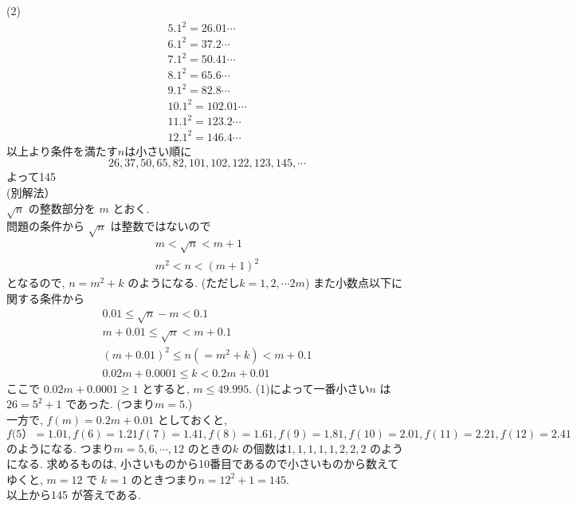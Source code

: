\documentclass[12pt,a4j]{jarticle}
\begin{document}
(2)
\begin{align*}
5.1^2=26.01\cdots
\\6.1^2=37.2\cdots
\\7.1^2=50.41\cdots
\\8.1^2=65.6\cdots
\\9.1^2=82.8\cdots
\\10.1^2=102.01\cdots
\\11.1^2=123.2\cdots
\\12.1^2=146.4\cdots
\end{align*}
以上より条件を満たす$n$は小さい順に
$$
26,37,50,65,82,101,102,122,123,145,\cdots
$$
よって145 \\

(別解法） \\
$\sqrt{n}$ の整数部分を $m$ とおく.　\\
問題の条件から $\sqrt{n}$ は整数ではないので
\begin{align*}
 m < \sqrt{n} < m + 1 \\
 m^2 < n < (m+1)^2
\end{align*}
となるので, $n=m^2 + k$ のようになる. (ただし$k =1, 2, \cdots 2m$)
また小数点以下に関する条件から
\begin{align*}
0.01 \le \sqrt{n} -m < 0.1 \\
m + 0.01 \le \sqrt{n} < m + 0.1 \\
(m + 0.01)^2 \le n (=m^2 + k) < m + 0.1 \\
0.02m + 0.0001 \le k < 0.2m + 0.01
\end{align*}
ここで $0.02m + 0.0001 \ge 1$ とすると, $m \le 49.995$.
(1)によって一番小さい$n$ は $26 = 5^2 +1$ であった. (つまり$m=5$.) \\
一方で, $f(m) = 0.2m + 0.01 $ としておくと,
$f(5）= 1.01 , f(6) = 1.21 f(7) = 1.41,  f(8) = 1.61,  f(9) = 1.81,  f(10) = 2.01, f(11) = 2.21, f(12) = 2.41$
のようになる. つまり$m=5, 6, \cdots, 12$ のときの$k$ の個数は$1, 1, 1, 1, 1, 2, 2, 2$ のようになる.
求めるものは, 小さいものから10番目であるので小さいものから数えてゆくと,
$m=12$ で $k=1$ のときつまり$n=12^2 +1 = 145$. \\
以上から145 が答えである.
\end{document}
